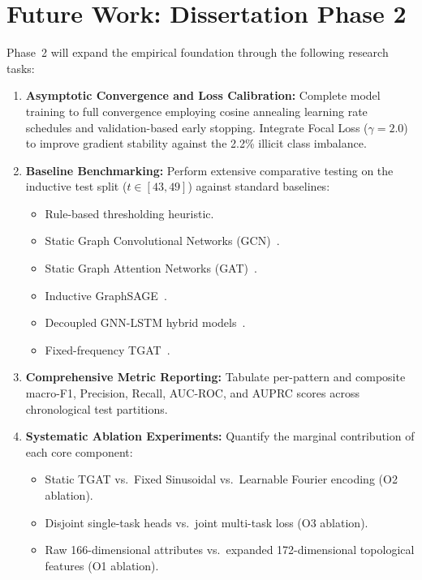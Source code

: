 \section{Future Work: Dissertation Phase 2}
\label{sec:future_work}

Phase~2 will expand the empirical foundation through the following research tasks:

\begin{enumerate}
    \item \textbf{Asymptotic Convergence and Loss Calibration:} Complete model training to full convergence employing cosine annealing learning rate schedules and validation-based early stopping. Integrate Focal Loss ($\gamma = 2.0$) to improve gradient stability against the 2.2\% illicit class imbalance.

    \item \textbf{Baseline Benchmarking:} Perform extensive comparative testing on the inductive test split ($t \in [43, 49]$) against standard baselines:
    \begin{itemize}
        \item Rule-based thresholding heuristic.
        \item Static Graph Convolutional Networks (GCN)~\cite{kipf2017gcn}.
        \item Static Graph Attention Networks (GAT)~\cite{velivckovic2018gat}.
        \item Inductive GraphSAGE~\cite{hamilton2017graphsage}.
        \item Decoupled GNN-LSTM hybrid models~\cite{kim2022gnn}.
        \item Fixed-frequency TGAT~\cite{xu2020tgat}.
    \end{itemize}

    \item \textbf{Comprehensive Metric Reporting:} Tabulate per-pattern and composite macro-F1, Precision, Recall, AUC-ROC, and AUPRC scores across chronological test partitions.

    \item \textbf{Systematic Ablation Experiments:} Quantify the marginal contribution of each core component:
    \begin{itemize}
        \item Static TGAT vs.\ Fixed Sinusoidal vs.\ Learnable Fourier encoding (O2 ablation).
        \item Disjoint single-task heads vs.\ joint multi-task loss (O3 ablation).
        \item Raw 166-dimensional attributes vs.\ expanded 172-dimensional topological features (O1 ablation).
    \end{itemize}


\end{enumerate}
